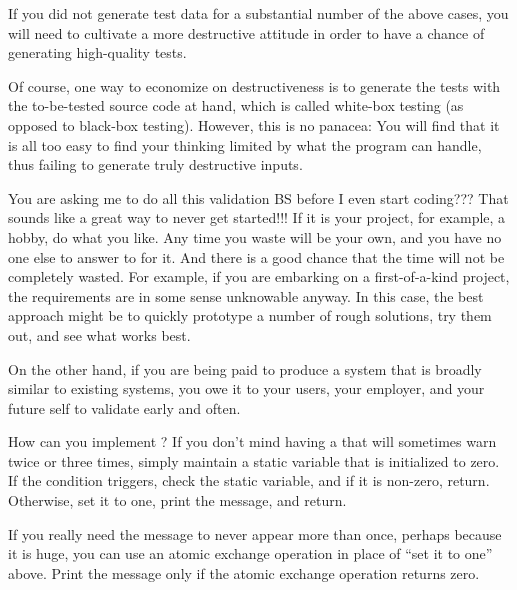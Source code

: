 	If you did not generate test data for a substantial number of
	the above cases, you will need to cultivate a more destructive
	attitude in order to have a chance of generating high-quality
	tests.

	Of course, one way to economize on destructiveness is to
	generate the tests with the to-be-tested source code at hand,
	which is called white-box testing (as opposed to black-box testing).
	However, this is no panacea: You will find that it is all too
	easy to find your thinking limited by what the program can handle,
	thus failing to generate truly destructive inputs.

\QuickQ{}
	You are asking me to do all this validation BS before
	I even start coding???
	That sounds like a great way to never get started!!!
\QuickA{}
	If it is your project, for example, a hobby, do what you like.
	Any time you waste will be your own, and you have no one else
	to answer to for it.
	And there is a good chance that the time will not be completely
	wasted.
	For example, if you are embarking on a first-of-a-kind project,
	the requirements are in some sense unknowable anyway.
	In this case, the best approach might be to quickly prototype
	a number of rough solutions, try them out, and see what works
	best.

	On the other hand, if you are being paid to produce a system that
	is broadly similar to existing systems, you owe it to your users,
	your employer, and your future self to validate early and often.

\QuickQ{}
	How can you implement ?
\QuickA{}
	If you don't mind having a  that
	will sometimes warn twice or three times, simply maintain
	a static variable that is initialized to zero.
	If the condition triggers, check the static variable, and
	if it is non-zero, return.
	Otherwise, set it to one, print the message, and return.

	If you really need the message to never appear more than once,
	perhaps because it is huge, you can use an atomic exchange
	operation in place of ``set it to one'' above.
	Print the message only if the atomic exchange operation returns
	zero.

